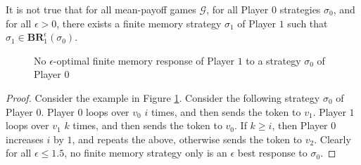 \begin{theorem}
\label{ThmP1NeedInfMem}
It is not true that for all mean-payoff games $\mathcal{G}$, for all Player $0$ strategies $\sigma_0$, and for all $\epsilon > 0$, there exists a finite memory strategy $\sigma_1$ of Player $1$ such that $\sigma_1 \in \mathbf{BR}_1^{\epsilon}(\sigma_0)$.
\end{theorem}
\begin{figure}
    \centering
    \caption{No $\epsilon$-optimal finite memory response of Player $1$ to a strategy $\sigma_0$ of Player $0$}
    \label{fig:no_optimal_response}
\end{figure}
\begin{proof}
Consider the example in Figure \ref{fig:no_optimal_response}.
Consider the following strategy $\sigma_0$ of Player $0$.
Player $0$ loops over $v_0$ $i$ times, and then sends the token to $v_1$.
Player $1$ loops over $v_1$ $k$ times, and then sends the token to $v_0$.
If $k \geqslant i$, then Player $0$ increases $i$ by $1$, and repeats the above, otherwise sends the token to $v_2$.
Clearly for all $\epsilon \leqslant 1.5$, no finite memory strategy only is an $\epsilon$ best response to $\sigma_0$.
\end{proof}